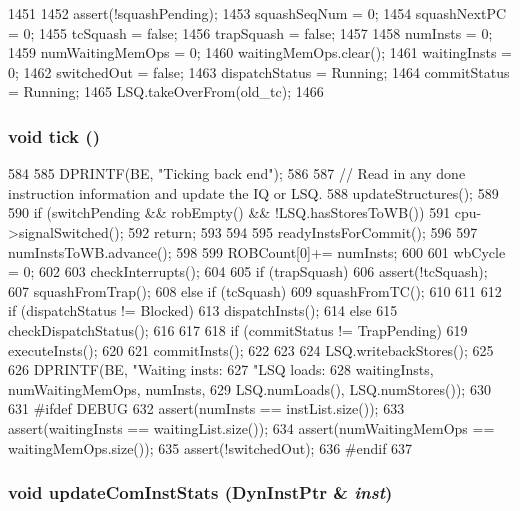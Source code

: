 \begin{DoxyCode}
1451 {
1452     assert(!squashPending);
1453     squashSeqNum = 0;
1454     squashNextPC = 0;
1455     tcSquash = false;
1456     trapSquash = false;
1457 
1458     numInsts = 0;
1459     numWaitingMemOps = 0;
1460     waitingMemOps.clear();
1461     waitingInsts = 0;
1462     switchedOut = false;
1463     dispatchStatus = Running;
1464     commitStatus = Running;
1465     LSQ.takeOverFrom(old_tc);
1466 }
\end{DoxyCode}
\hypertarget{classLWBackEnd_a873dd91783f9efb4a590aded1f70d6b0}{
\subsubsection[{tick}]{\setlength{\rightskip}{0pt plus 5cm}void tick ()}}
\label{classLWBackEnd_a873dd91783f9efb4a590aded1f70d6b0}



\begin{DoxyCode}
584 {
585     DPRINTF(BE, "Ticking back end\n");
586 
587     // Read in any done instruction information and update the IQ or LSQ.
588     updateStructures();
589 
590     if (switchPending && robEmpty() && !LSQ.hasStoresToWB()) {
591         cpu->signalSwitched();
592         return;
593     }
594 
595     readyInstsForCommit();
596 
597     numInstsToWB.advance();
598 
599     ROBCount[0]+= numInsts;
600 
601     wbCycle = 0;
602 
603     checkInterrupts();
604 
605     if (trapSquash) {
606         assert(!tcSquash);
607         squashFromTrap();
608     } else if (tcSquash) {
609         squashFromTC();
610     }
611 
612     if (dispatchStatus != Blocked) {
613         dispatchInsts();
614     } else {
615         checkDispatchStatus();
616     }
617 
618     if (commitStatus != TrapPending) {
619         executeInsts();
620 
621         commitInsts();
622     }
623 
624     LSQ.writebackStores();
625 
626     DPRINTF(BE, "Waiting insts: %
627             "LSQ loads: %
628             waitingInsts, numWaitingMemOps, numInsts,
629             LSQ.numLoads(), LSQ.numStores());
630 
631 #ifdef DEBUG
632     assert(numInsts == instList.size());
633     assert(waitingInsts == waitingList.size());
634     assert(numWaitingMemOps == waitingMemOps.size());
635     assert(!switchedOut);
636 #endif
637 }
\end{DoxyCode}
\hypertarget{classLWBackEnd_a5bbf266cb0cc97eed138c8fe0d2d76b6}{
\subsubsection[{updateComInstStats}]{\setlength{\rightskip}{0pt plus 5cm}void updateComInstStats ({\bf DynInstPtr} \& {\em inst})}}
\label{classLWBackEnd_a5bbf266cb0cc97eed138c8fe0d2d76b6}



